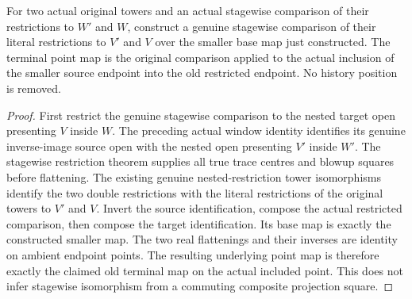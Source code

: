 \begin{theorem}
\label{hir:sharp-actual-nested-stagewise-comparison}
\leanok
For two actual original towers and an actual stagewise comparison of their
restrictions to $W'$ and $W$, construct a genuine stagewise comparison of
their literal restrictions to $V'$ and $V$ over the smaller base map just
constructed. The terminal point map is the original comparison applied to
the actual inclusion of the smaller source endpoint into the old restricted
endpoint. No history position is removed.
\end{theorem}
\begin{proof}
First restrict the genuine stagewise comparison to the nested target open
presenting $V$ inside $W$. The preceding actual window identity identifies
its genuine inverse-image source open with the nested open presenting $V'$
inside $W'$. The stagewise restriction theorem supplies all true trace
centres and blowup squares before flattening. The existing genuine
nested-restriction tower isomorphisms identify the two double restrictions
with the literal restrictions of the original towers to $V'$ and $V$.
Invert the source identification, compose the actual restricted comparison,
then compose the target identification. Its base map is exactly the
constructed smaller map. The two real flattenings and their inverses are
identity on ambient endpoint points. The resulting underlying point map
is therefore exactly the claimed old terminal map on the actual included
point. This does not infer stagewise isomorphism from a commuting composite
projection square.
\end{proof}

